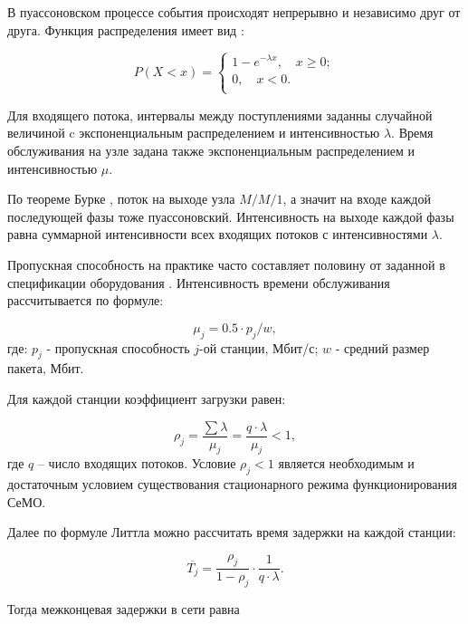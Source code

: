 В пуассоновском процессе события происходят непрерывно и независимо друг от друга. Функция распределения имеет вид  \cite{VishnevskyBook, Kleinrock1975}:

\begin{displaymath}
P(X<x) = 
  \begin{cases}
    1 - e^{- \lambda x}, \quad x \geqslant 0; \\
    0, \quad x < 0.\\
  \end{cases}
\end{displaymath}

Для входящего потока, интервалы между поступлениями заданны случайной величиной c экспоненциальным распределением и интенсивностью $\lambda$. Время обслуживания на узле задана также экспоненциальным распределением и интенсивностью $\mu$. 


По теореме Бурке \cite{Burke1956}, поток на выходе узла $M/M/1$, а значит на входе каждой последующей фазы тоже пуассоновский. Интенсивность на выходе каждой фазы равна суммарной интенсивности всех входящих потоков с интенсивностями $\lambda$.

Пропускная способность на практике часто составляет половину от заданной в спецификации оборудования \cite{Proletarsky, Vladimirov2019}. Интенсивность времени обслуживания рассчитывается по формуле: 

\begin{displaymath}
    \mu_j = 0.5 \cdot p_j / w,
\end{displaymath}
где: $p_j$ - пропускная способность $j$-ой станции, Мбит/с; $w$ - средний размер пакета, Мбит.

Для каждой станции коэффициент загрузки равен:


\begin{displaymath}
\rho_j= \frac{\sum{\lambda}}{\mu_j} = \frac{q \cdot \lambda}{\mu_j} <1,
\end{displaymath}
где $q$ -- число входящих потоков. Условие $\rho_j<1$ является необходимым и достаточным условием существования стационарного режима функционирования СеМО.

Далее по формуле Литтла \cite{Little1961} можно рассчитать время задержки на каждой станции:

\begin{displaymath}
    \overline{T_j} = \frac{\rho_j}{1 - \rho_j} \cdot \frac{1}{q \cdot \lambda}.
\end{displaymath}

Тогда межконцевая задержки в сети равна


